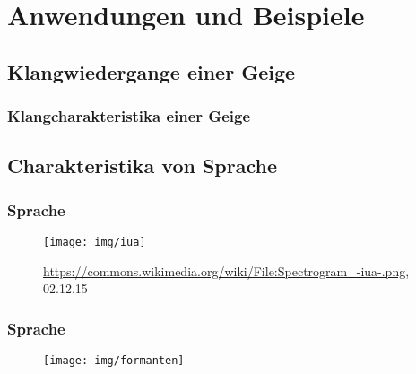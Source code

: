 \section{Anwendungen und Beispiele}

\subsection{Klangwiedergange einer Geige}

\begin{frame}
  \frametitle{Klangcharakteristika einer Geige}
  \begin{figure}
    \centering
    \label{img:violin}
  \end{figure}
\end{frame}

\subsection{Charakteristika von Sprache}

\begin{frame}
  \frametitle{Sprache}
    \begin{figure}
      \centering
      \texttt{[image: img/iua]}
      \label{img:vowls}
      \caption{\url{https://commons.wikimedia.org/wiki/File:Spectrogram_-iua-.png}, 02.12.15}
    \end{figure}
\end{frame}

\begin{frame}
  \frametitle{Sprache}
    \begin{figure}
      \centering
      \texttt{[image: img/formanten]}
      \label{img:vowls}
    \end{figure}
\end{frame}
